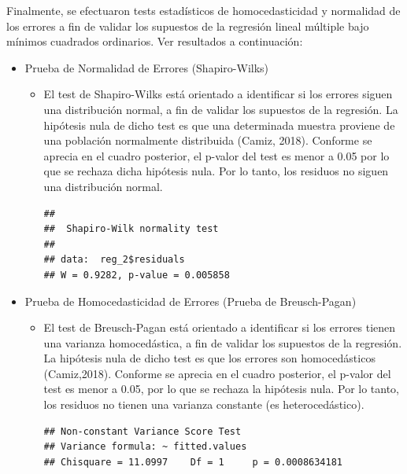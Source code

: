 \documentclass[a4paper,10pt]{article}\usepackage[]{graphicx}\usepackage[]{color}
\makeatletter
\newenvironment{kframe}{%
 \def\at@end@of@kframe{}%
 \ifinner\ifhmode%
  \def\at@end@of@kframe{\end{minipage}}%
  \begin{minipage}{\columnwidth}%
 \fi\fi%
 \def\FrameCommand##1{\hskip\@totalleftmargin \hskip-\fboxsep
 \colorbox{shadecolor}{##1}\hskip-\fboxsep
     \hskip-\linewidth \hskip-\@totalleftmargin \hskip\columnwidth}%
 \MakeFramed {\advance\hsize-\width
   \@totalleftmargin\z@ \linewidth\hsize
   \@setminipage}}%
 {\par\unskip\endMakeFramed%
 \at@end@of@kframe}
\newenvironment{knitrout}{}{} %
\makeatother
\begin{document}
Finalmente, se efectuaron tests estadísticos de homocedasticidad y normalidad de los errores a fin de validar los supuestos de la regresión lineal múltiple bajo mínimos cuadrados ordinarios. Ver resultados a continuación:

\begin{itemize}
  \item Prueba de Normalidad de Errores (Shapiro-Wilks)
    \begin{itemize}
      \item El test de Shapiro-Wilks está orientado a identificar si los errores siguen una distribución normal, a fin de validar los supuestos de la regresión. La hipótesis nula de dicho test es que una determinada muestra proviene de una población normalmente distribuida (Camiz, 2018). Conforme se aprecia en el cuadro posterior, el p-valor del test es menor a 0.05 por lo que se rechaza dicha hipótesis nula. Por lo tanto, los residuos no siguen una distribución normal.
\begin{knitrout}
\color{fgcolor}\begin{kframe}
\begin{verbatim}
## 
## 	Shapiro-Wilk normality test
## 
## data:  reg_2$residuals
## W = 0.9282, p-value = 0.005858
\end{verbatim}
\end{kframe}
\end{knitrout}
    \end{itemize}  
  \item Prueba de Homocedasticidad de Errores (Prueba de Breusch-Pagan)
    \begin{itemize}
      \item El test de Breusch-Pagan está orientado a identificar si los errores tienen una varianza homocedástica, a fin de validar los supuestos de la regresión. La hipótesis nula de dicho test es que los errores son homocedásticos (Camiz,2018). Conforme se aprecia en el cuadro posterior, el p-valor del test es menor a 0.05, por lo que se rechaza la hipótesis nula. Por lo tanto, los residuos no tienen una varianza constante (es heterocedástico).
\begin{knitrout}
\color{fgcolor}\begin{kframe}
\begin{verbatim}
## Non-constant Variance Score Test 
## Variance formula: ~ fitted.values 
## Chisquare = 11.0997    Df = 1     p = 0.0008634181
\end{verbatim}
\end{kframe}
\end{knitrout}
    \end{itemize}
\end{itemize}
\end{document}
